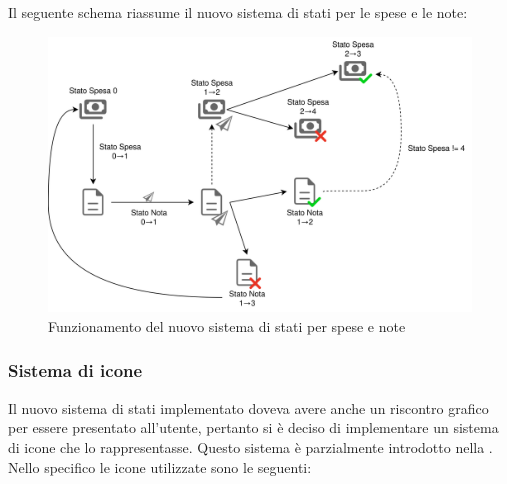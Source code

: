 \noindent Il seguente schema riassume il nuovo sistema di stati per le spese e le note:

\begin{figure}[h!]
    \centering
    \includegraphics[width=.9\columnwidth]{images/StatiLife.png}
    \caption{Funzionamento del nuovo sistema di stati per spese e note}
    \label{fig:sistemaStati}
\end{figure}

\subsubsection{Sistema di icone}

Il nuovo sistema di stati implementato doveva avere anche un riscontro grafico per essere presentato all'utente, pertanto si è deciso di implementare un sistema di icone che lo rappresentasse. Questo sistema è parzialmente introdotto nella . Nello specifico le icone utilizzate sono le seguenti:

